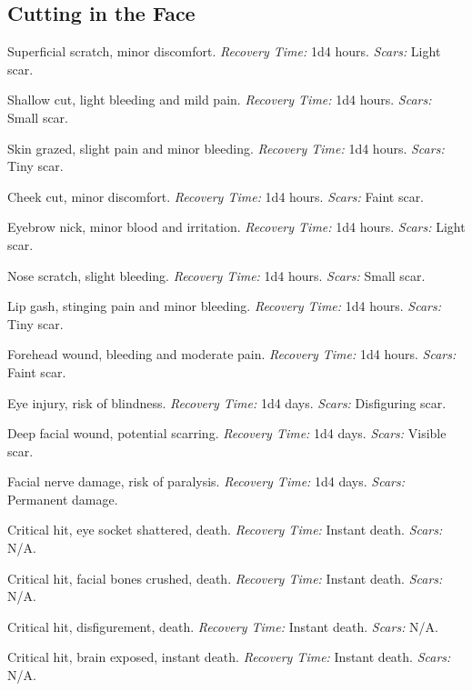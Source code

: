 \documentclass[12pt]{book}
\begin{document}
\subsection{Cutting in the Face}

\begin{description}[labelwidth=1.5em, leftmargin=*, itemsep=0.4em]
    \item[1 -] Superficial scratch, minor discomfort. \textit{Recovery Time:} 1d4 hours. \textit{Scars:} Light scar.
    \item[2 -] Shallow cut, light bleeding and mild pain. \textit{Recovery Time:} 1d4 hours. \textit{Scars:} Small scar.
    \item[3 -] Skin grazed, slight pain and minor bleeding. \textit{Recovery Time:} 1d4 hours. \textit{Scars:} Tiny scar.
    \item[4 -] Cheek cut, minor discomfort. \textit{Recovery Time:} 1d4 hours. \textit{Scars:} Faint scar.
    \item[5 -] Eyebrow nick, minor blood and irritation. \textit{Recovery Time:} 1d4 hours. \textit{Scars:} Light scar.
    \item[6 -] Nose scratch, slight bleeding. \textit{Recovery Time:} 1d4 hours. \textit{Scars:} Small scar.
    \item[7 -] Lip gash, stinging pain and minor bleeding. \textit{Recovery Time:} 1d4 hours. \textit{Scars:} Tiny scar.
    \item[8 -] Forehead wound, bleeding and moderate pain. \textit{Recovery Time:} 1d4 hours. \textit{Scars:} Faint scar.
    \item[9 -] Eye injury, risk of blindness. \textit{Recovery Time:} 1d4 days. \textit{Scars:} Disfiguring scar.
    \item[10 -] Deep facial wound, potential scarring. \textit{Recovery Time:} 1d4 days. \textit{Scars:} Visible scar.
    \item[11 -] Facial nerve damage, risk of paralysis. \textit{Recovery Time:} 1d4 days. \textit{Scars:} Permanent damage.
    \item[12 -] Critical hit, eye socket shattered, death. \textit{Recovery Time:} Instant death. \textit{Scars:} N/A.
    \item[13 -] Critical hit, facial bones crushed, death. \textit{Recovery Time:} Instant death. \textit{Scars:} N/A.
    \item[14 -] Critical hit, disfigurement, death. \textit{Recovery Time:} Instant death. \textit{Scars:} N/A.
    \item[15 -] Critical hit, brain exposed, instant death. \textit{Recovery Time:} Instant death. \textit{Scars:} N/A.

\end{description}
\end{document}
